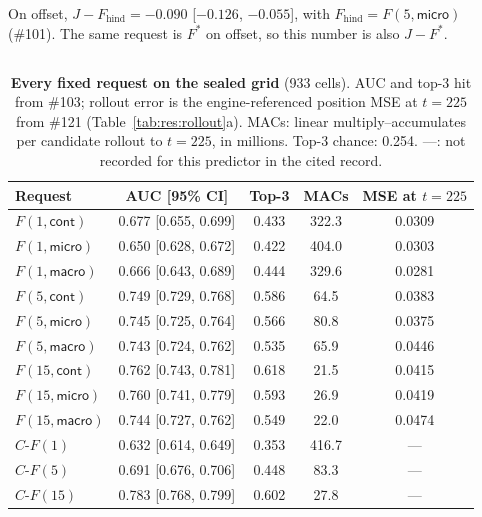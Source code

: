 \begin{revblock}
On offset, $J-F_{\mathrm{hind}}=-0.090$ [$-0.126$, $-0.055$], with $F_{\mathrm{hind}}=F(5,\textsf{micro})$ (\#101). The same request is $F^{*}$ on offset, so this number is also $J-F^{*}$.
\end{revblock}

\subsection{\texorpdfstring{}{All fixed requests on the sealed grid}}
\label{sec:app:res:fixed}

\begin{table}[h]
\begin{revblock}
\centering
\footnotesize
\caption{\textbf{Every fixed request on the sealed grid} (933 cells). AUC and top-3 hit from \#103; rollout error is the engine-referenced position MSE at $t=225$ from \#121 (Table~\ref{tab:res:rollout}a). MACs: linear multiply--accumulates per candidate rollout to $t=225$, in millions. Top-3 chance: 0.254. ---: not recorded for this predictor in the cited record.}
\label{tab:app:res:fixed}
\begin{tabular}{@{}lcccc@{}}
\toprule
Request & AUC [95\% CI] & Top-3 & MACs & MSE at $t=225$ \\
\midrule
$F(1,\textsf{cont})$ & 0.677 [0.655, 0.699] & 0.433 & 322.3 & 0.0309 \\
$F(1,\textsf{micro})$ & 0.650 [0.628, 0.672] & 0.422 & 404.0 & 0.0303 \\
$F(1,\textsf{macro})$ & 0.666 [0.643, 0.689] & 0.444 & 329.6 & 0.0281 \\
$F(5,\textsf{cont})$ & 0.749 [0.729, 0.768] & 0.586 & 64.5 & 0.0383 \\
$F(5,\textsf{micro})$ & 0.745 [0.725, 0.764] & 0.566 & 80.8 & 0.0375 \\
$F(5,\textsf{macro})$ & 0.743 [0.724, 0.762] & 0.535 & 65.9 & 0.0446 \\
$F(15,\textsf{cont})$ & 0.762 [0.743, 0.781] & 0.618 & 21.5 & 0.0415 \\
$F(15,\textsf{micro})$ & 0.760 [0.741, 0.779] & 0.593 & 26.9 & 0.0419 \\
$F(15,\textsf{macro})$ & 0.744 [0.727, 0.762] & 0.549 & 22.0 & 0.0474 \\
\midrule
$C\text{-}F(1)$ & 0.632 [0.614, 0.649] & 0.353 & 416.7 & --- \\
$C\text{-}F(5)$ & 0.691 [0.676, 0.706] & 0.448 & 83.3 & --- \\
$C\text{-}F(15)$ & 0.783 [0.768, 0.799] & 0.602 & 27.8 & --- \\
\bottomrule
\end{tabular}
\end{revblock}
\end{table}

